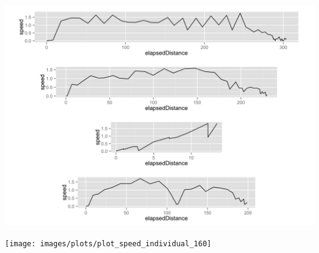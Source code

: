 \begin{appendices}
\begin{minipage}{\textwidth}
\begin{minipage}{0.5\linewidth}
		\includegraphics[width=\linewidth]{images/plots/plot_speed_individual_113}
	\end{minipage}
	\begin{minipage}{0.5\linewidth}
		\texttt{[image: images/plots/plot\_speed\_individual\_160]}
	\end{minipage}
	\label{fig:kvaliativ_persons_3}
\end{minipage}


\end{appendices}

